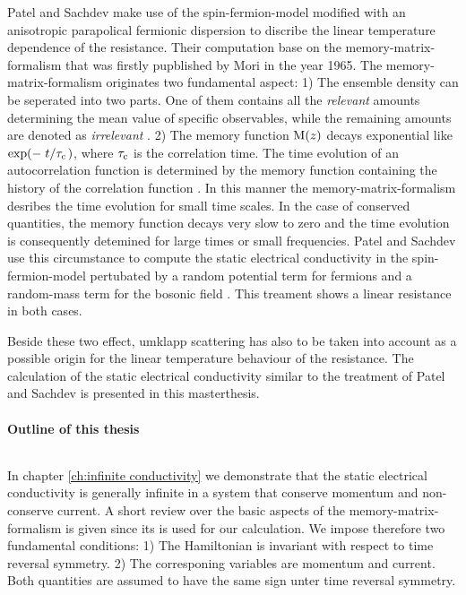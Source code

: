 Patel and Sachdev \cite{Patel&Sachdev} make use of the spin-fermion-model modified with an \linebreak anisotropic parapolical fermionic dispersion to discribe the linear temperature dependence of the resistance.
Their computation base on the memory-matrix-formalism that was firstly pupblished by Mori \cite{Mori} in the year 1965.
The memory-matrix-formalism originates two fundamental aspect: 
1) The ensemble density can be seperated into two parts.
One of them contains all the \emph{relevant} amounts determining the mean value of specific observables, while the remaining amounts are denoted as \emph{irrelevant} \cite{Zwanzig}.
2) The memory function $\mathrm{M}(z)$ decays exponential like $\exp(-\flatfrac{t}{\tau_{\mt{c}}})$, where $\tau_{\mathrm{c}}$ is the correlation time.
The time evolution of an autocorrelation function is determined by the memory function containing the history of the correlation function \cite{Berne&Boob&Rice}.
In this manner the memory-matrix-formalism desribes the time evolution for small time scales.
In the case of conserved quantities, the memory function decays very slow to zero and the time evolution is consequently detemined for large times or small frequencies.
Patel and Sachdev use this circumstance to compute the static electrical conductivity in the spin-fermion-model pertubated by a random potential term for fermions and a random-mass term for the bosonic field \cite{Patel&Sachdev}.
This treament shows a linear resistance in both cases.

Beside these two effect, umklapp scattering has also to be taken into account as a possible origin for the linear temperature behaviour of the resistance.
The calculation of the static electrical conductivity similar to the treatment of Patel and Sachdev is presented in this masterthesis.

\paragraph{Outline of this thesis}$\:$\vspace{3.5ex}

In chapter \ref{ch:infinite conductivity} we demonstrate that the static electrical conductivity is generally infinite in a system that conserve momentum and non-conserve current. 
A short review over the basic aspects of the memory-matrix-formalism is given since its is used for our calculation.
We impose therefore two fundamental conditions: 
1) The Hamiltonian is invariant with respect to time reversal symmetry.
2) The corresponing variables are momentum and current.
Both quantities are assumed to have the same sign unter time reversal symmetry.

